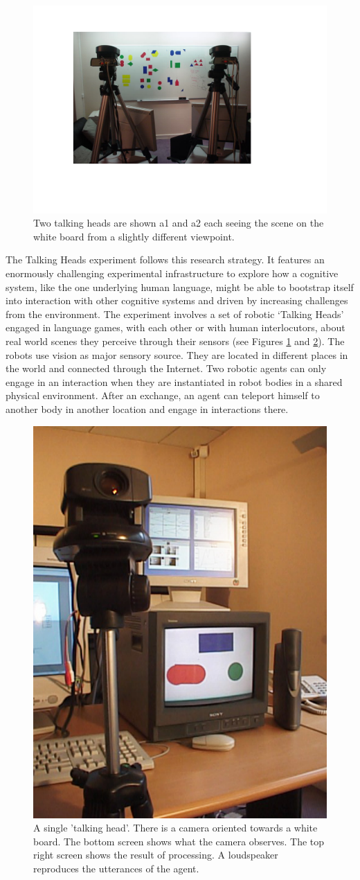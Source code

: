 \begin{figure}[htbp]
  \centerline{\includegraphics[width=.65\textwidth]{chap1/figs/heads}}
\caption{Two talking heads are shown {\bfshape a1} and 
{\bfshape a2} each seeing the scene on the white board from a slightly different viewpoint.}
\label{f:plate1}
\end{figure}

The Talking Heads experiment follows this research strategy. 
It features an enormously challenging experimental
infrastructure to explore how a cognitive
system, like the one underlying human language, might
be able to bootstrap itself into interaction 
with other cognitive systems and driven by increasing
challenges from the environment. The experiment
involves a set of robotic `Talking Heads' engaged in language
games, with each other or with human interlocutors, 
about real world scenes they perceive through their sensors
(see Figures \ref{f:plate1} and \ref{f:plate2}). 
The robots use vision as major sensory source. They are located in
different places in the world and connected through the Internet. 
Two robotic agents can only engage in an interaction when they 
are instantiated in robot bodies in a shared physical environment. 
After an exchange, an agent can teleport himself to another body in 
another location and engage in interactions there. 


\begin{figure}[htbp]
  \centerline{\includegraphics[width=.40\textwidth]{chap1/figs/head}}
\caption{ A single 'talking head'. There is a camera oriented towards a
white board. The bottom screen shows what the camera observes. The top right screen shows the result of processing.
A loudspeaker reproduces the utterances of the agent. }
\label{f:plate2}
\end{figure}

